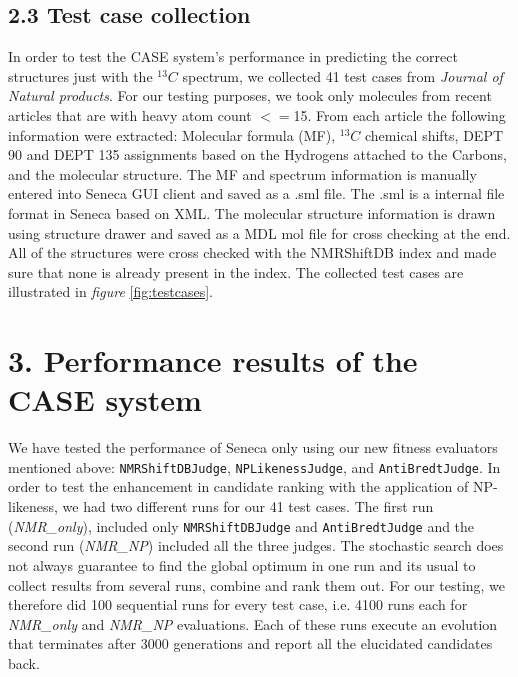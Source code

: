 \documentclass[10pt]{bmc_article}
\newenvironment{bmcformat}{\begin{raggedright}\baselineskip20pt\sloppy\setboolean{publ}{false}}{\end{raggedright}\baselineskip20pt\sloppy}
\begin{document}
\begin{bmcformat}
\subsection*{2.3 Test case collection}

In order to test the CASE system's performance in predicting the correct structures just with the $^{13}C$ spectrum, we collected 41 test cases from \emph{Journal of Natural products}. For our testing purposes, we took only molecules from recent articles that are with heavy atom count $<=$15. From each article the following information were extracted: Molecular formula (MF), $^{13}C$ chemical shifts,  DEPT 90 and DEPT 135 assignments based on the Hydrogens attached to the Carbons, and the molecular structure. The MF and spectrum information is manually entered into Seneca GUI client and saved as a .sml file. The .sml is a internal file format in Seneca based on XML. The molecular structure information is drawn using structure drawer and saved as a MDL mol file for cross checking at the end. All of the structures were cross checked with the NMRShiftDB index and made sure that none is  already present in the index. The collected test cases are illustrated in \emph{figure} \ref{fig:testcases}.

\section*{3. Performance results of the CASE system}

 
We have tested the performance of Seneca only using our new fitness evaluators mentioned above: \texttt{NMRShiftDBJudge}, \texttt{NPLikenessJudge}, and \texttt{AntiBredtJudge}. In order to test the enhancement in candidate ranking with the application of NP-likeness, we had two different runs for our 41 test cases. The first run (\emph {NMR\_only}), included only  \texttt{NMRShiftDBJudge} and \texttt{AntiBredtJudge} and the second run (\emph {NMR\_NP}) included all the three judges. The stochastic search does not always guarantee to find the global optimum in one run and its usual to collect results from several runs, combine and rank them out. For our testing, we therefore did 100 sequential runs for every test case, i.e. 4100 runs each for  \emph {NMR\_only} and \emph {NMR\_NP} evaluations. Each of these runs execute an evolution that terminates after 3000 generations and report all the elucidated candidates back.


\end{bmcformat}
\end{document}
